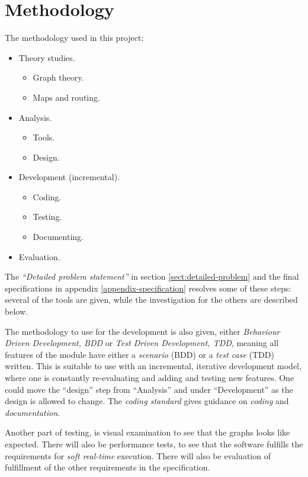 \documentclass[../main.tex]{subfiles}
\begin{document}
\chapter{Methodology}
The methodology used in this project:
\begin{itemize}
    \item Theory studies.
    \begin{itemize}
        \item Graph theory.
        \item Maps and routing.
    \end{itemize}
    \item Analysis.
    \begin{itemize}
        \item Tools.
        \item Design.
    \end{itemize}
    \item Development (incremental).
    \begin{itemize}
        \item Coding.
        \item Testing.
        \item Documenting.
    \end{itemize}
    \item Evaluation.
\end{itemize}

\noindent
The \textit{``Detailed problem statement''} in section \ref{sect:detailed-problem} and the final specifications in appendix \ref{appendix-specification} resolves some of these steps: several of the tools are given, while the investigation for the others are described below. 

The methodology to use for the development is also given, either \emph{Behaviour Driven Development, BDD} or \emph{Test Driven Development, TDD}, meaning all features of the module have either a \emph{scenario} (BDD) or a \emph{test case} (TDD) written. This is suitable to use with an incremental, iterative development model, where one is constantly re-evaluating and adding and testing new features. One could move the ``design'' step from ``Analysis'' and under ``Development'' as the design is allowed to change. The \textit{coding standard} gives guidance on \textit{coding} and \textit{documentation}. 

Another part of testing, is visual examination to see that the graphs looks like expected. There will also be performance tests, to see that the software fulfills the requirements for \textit{soft real-time} execution. There will also be evaluation of fulfillment of the other requirements in the specification.
\end{document}
